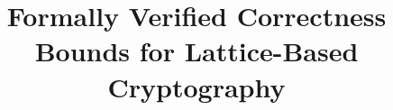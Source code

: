 \documentclass[conference,compsoc]{IEEEtran}
\begin{document}
\title{Formally Verified Correctness Bounds for Lattice-Based Cryptography}

\author{
  }


% 

\maketitle
\end{document}
